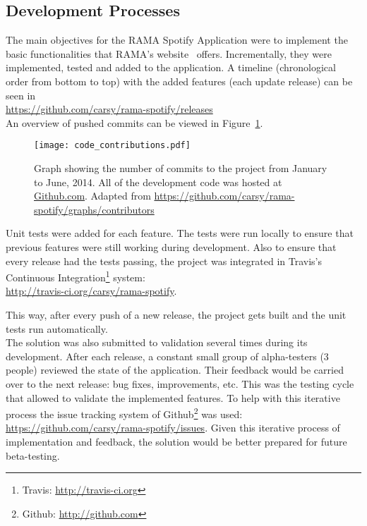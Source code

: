 

  \clearpage


  \subsection{Development Processes} %
    \label{sub:development_process}

    The main objectives for the RAMA Spotify Application were to implement the basic functionalities that RAMA's website~\cite{ramaapp} offers.
    Incrementally, they were implemented, tested and added to the application.
    A timeline (chronological order from bottom to top) with the added features (each update release) can be seen in \\ 
    \indent \url{https://github.com/carsy/rama-spotify/releases} \\

    An overview of pushed commits can be viewed in Figure~\ref{fig:code_contributions}.

    \begin{figure}[H]
      \begin{center}
        \texttt{[image: code\_contributions.pdf]}
      \end{center}
      \caption{Graph showing the number of commits to the project from January to June, 2014. All of the development code was hosted at \url{Github.com}. Adapted from \url{https://github.com/carsy/rama-spotify/graphs/contributors}}
      \label{fig:code_contributions}
    \end{figure}

    Unit tests were added for each feature.
    The tests were run locally to ensure that previous features were still working during development.
    Also to ensure that every release had the tests passing, the project was integrated in Travis's Continuous Integration\footnote{Travis: \url{http://travis-ci.org}} system: \\
    \indent \url{http://travis-ci.org/carsy/rama-spotify}.

    This way, after every push of a new release, the project gets built and the unit tests run automatically. \\

    The solution was also submitted to validation several times during its development.
    After each release, a constant small group of alpha-testers (3 people) reviewed the state of the application.
    Their feedback would be carried over to the next release: bug fixes, improvements, etc.
    This was the testing cycle that allowed to validate the implemented features.
    To help with this iterative process the issue tracking system of Github\footnote{Github: \url{http://github.com}} was used: \url{https://github.com/carsy/rama-spotify/issues}.
    Given this iterative process of implementation and feedback, the solution would be better prepared for future beta-testing.

